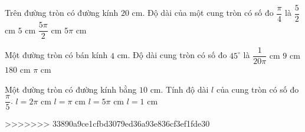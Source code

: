 \begin{ex}%
	Trên đường tròn có đường kính $20$ cm. Độ dài của một cung tròn có số đo $\dfrac{\pi}{4}$ là
	\choice
	{$\dfrac{5}{2}$ cm}
	{$5$ cm}
	{\True $\dfrac{5\pi}{2}$ cm}
	{$5\pi$ cm}
\end{ex}

\begin{ex}%
	Một đường tròn có bán kính $4 $ cm. Độ dài cung tròn có số đo $45^{\circ}$ là
	\choice
	{$\dfrac{1}{20 \pi} $ cm}
	{$9 $ cm}
	{$180 $ cm}
	{\True $\pi $ cm}
\end{ex}

\begin{ex}%
	Một đường tròn có đường kính bằng $10 \text{ cm}$. Tính độ dài $l$ của cung tròn có số đo $\dfrac{\pi}{5}$.
	\choice
	{\True $l=2 \pi\text{ cm}$}
	{$l=\pi\text{ cm}$}
	{$l=5 \pi\text{ cm}$}
	{$l=1\text{ cm}$}
\end{ex}

>>>>>>> 33890a9ce1cfbd3079ed36a93e836cf3ef1fde30

